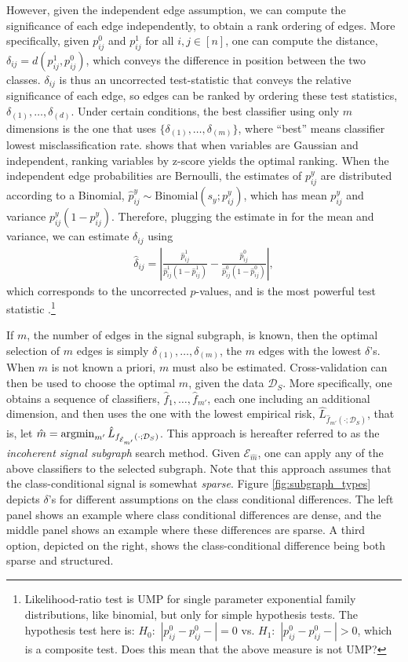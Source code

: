\documentclass[10pt,journal,cspaper,compsoc]{IEEEtran}
\providecommand{\mc}[1]{\mathcal{#1}}
\providecommand{\mh}[1]{\hat{#1}}
\providecommand{\mhc}[1]{\mh{\mathcal{#1}}}
\providecommand{\abs}[1]{\left \lvert#1 \right  \rvert}
\newcommand{\argmin}{\operatornamewithlimits{argmin}}
\begin{document}
However, given the independent edge assumption, we can compute the significance of each edge independently, to obtain a rank ordering of edges.  More specifically, given $p^0_{ij}$ and $p^1_{ij}$ for all $i,j \in [n]$, one can compute the distance, $\delta_{ij}=d(p^1_{ij},p^0_{ij})$, which conveys the difference in position between the two classes.  $\delta_{ij}$ is thus an uncorrected test-statistic that conveys the relative significance of each edge, so edges can  be ranked by ordering these test statistics, $\delta_{(1)}, \ldots, \delta_{(d)}$.  Under certain conditions, the best classifier using only $m$ dimensions is the one that uses $\{\delta_{(1)},\ldots, \delta_{(m)}\}$, where ``best'' means classifier lowest misclassification rate.  \cite{DGL96} shows that when variables are Gaussian and independent, ranking variables by z-score yields the optimal ranking.  When the independent edge probabilities are Bernoulli, the estimates of $p^y_{ij}$ are distributed according to a Binomial,  $\mh{p}^y_{ij} \sim \text{Binomial}(s_y; p^y_{ij})$, which has mean $p^y_{ij}$ and variance $p^y_{ij} (1-p^y_{ij})$.  Therefore, plugging the estimate in for the mean and variance, we can estimate $\delta_{ij}$ using 
\begin{align}
	\mh{\delta}_{ij}=  \abs{ \frac{\mh{p}^1_{ij}}{\mh{p}^1_{ij} (1-\mh{p}^1_{ij})} -  \frac{\mh{p}^0_{ij}}{\mh{p}^0_{ij} (1-\mh{p}^0_{ij})}},	
\end{align}
which corresponds to the uncorrected $p$-values, and is the most powerful test statistic \cite{Priebe}.\footnote{Likelihood-ratio test is UMP for single parameter exponential family distributions, like binomial, but only for simple hypothesis tests.  The hypothesis test here is: $H_0:$ $\abs{p_{ij}^0-p_{ij}^0-}=0$ vs. $H_1:$ $\abs{p_{ij}^0-p_{ij}^0-}>0$, which is a composite test.  Does this mean that the above measure is not UMP?}  


If $m$, the number of edges in the signal subgraph, is known, then the optimal selection of $m$ edges is simply $\delta_{(1)},\ldots, \delta_{(m)}$, the $m$ edges with the lowest $\delta$'s.  When $m$ is not known a priori, $m$ must also be estimated.   Cross-validation can then be used to choose the optimal $m$, given the data $\mc{D}_S$.  More specifically, one obtains a sequence of classifiers, $\mh{f}_1, \ldots, \mh{f}_{m'}$, each one including an additional dimension, and then uses the one with the lowest empirical risk, $\mh{L}_{\mh{f}_{m'}(\cdot; \mc{D}_S)}$, that is, let $\mh{m}=\argmin_{m'} \mh{L}_{f_{\mhc{E}_{m'}}(\cdot; \mc{D}_S)}$.  This approach is hereafter referred to as the \emph{incoherent signal subgraph} search method.  Given $\mc{E}_{\mh{m}}$, one can apply any of the above classifiers to the selected subgraph.  Note that this approach assumes that the class-conditional signal is somewhat \emph{sparse}.  Figure \ref{fig:subgraph_types} depicts $\delta$'s for different assumptions on the class conditional differences.  The left panel shows an example where class conditional differences are dense, and the middle panel shows an example where these differences are sparse.  A third option, depicted on the right, shows the class-conditional difference being both sparse and structured.
\end{document}
